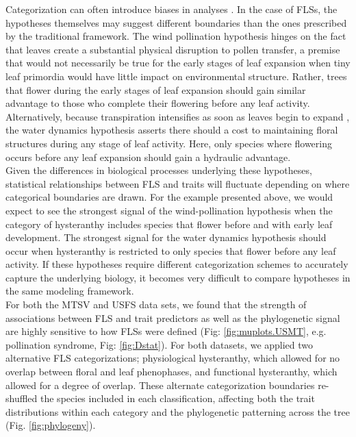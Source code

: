 \documentclass{article}
\begin{document}
\noindent Categorization can often introduce biases in analyses \citep{Naggara2011,Royston2006}. In the case of FLSs, the hypotheses themselves may suggest different boundaries than the ones prescribed by the traditional framework. The wind pollination hypothesis hinges on the fact that leaves create a substantial physical disruption to pollen transfer, a premise that would not necessarily be true for the early stages of leaf expansion when tiny leaf primordia would have little impact on environmental structure. Rather, trees that flower during the early stages of leaf expansion should gain similar advantage to those who complete their flowering before any leaf activity. Alternatively, because transpiration intensifies as soon as leaves begin to expand \citep{Breda1996,Wang2018}, the water dynamics hypothesis asserts there should a cost to maintaining floral structures during any stage of leaf activity. Here, only species where flowering occurs before any leaf expansion should gain a hydraulic advantage.\\ 

\noindent Given the differences in biological processes underlying these hypotheses, statistical relationships between FLS and traits will fluctuate depending on where categorical boundaries are drawn. For the example presented above, we would expect to see the strongest signal of the wind-pollination hypothesis when the category of hysteranthy includes species that flower before and with early leaf development. The strongest signal for the water dynamics hypothesis should occur when hysteranthy is restricted to only species that flower before any leaf activity. If these hypotheses require different categorization schemes to accurately capture the underlying biology, it becomes very difficult to compare hypotheses in the same modeling framework.\\

\noindent For both the MTSV and USFS data sets, we found that the strength of associations between FLS and trait predictors as well as the phylogenetic signal are highly sensitive to how FLSs were defined (Fig: \ref{fig:muplots.USMT}, e.g. pollination syndrome, Fig: \ref{fig:Dstat}). For both datasets, we applied two alternative FLS categorizations; physiological hysteranthy, which allowed for no overlap between floral and leaf phenophases, and functional hysteranthy, which allowed for a degree of overlap. These alternate categorization boundaries re-shuffled the species included in each classification, affecting both the trait distributions within each category and the phylogenetic patterning across the tree (Fig. \ref{fig:phylogeny}).\\ 
 
\end{document}
